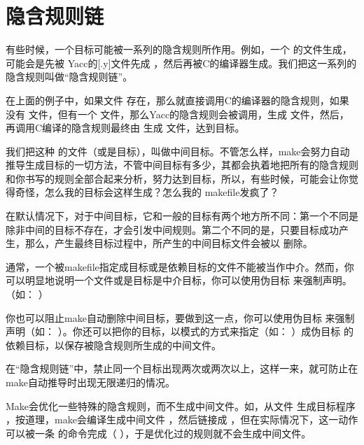 \documentclass[a4paper,10pt]{sphinxmanual}
\begin{document}
\section{隐含规则链}
\label{\detokenize{implicit_rules:id7}}
有些时候，一个目标可能被一系列的隐含规则所作用。例如，一个  的文件生成，可能会是先被
Yacc的{[}.y{]}文件先成  ，然后再被C的编译器生成。我们把这一系列的隐含规则叫做“隐含规则链”。

在上面的例子中，如果文件  存在，那么就直接调用C的编译器的隐含规则，如果没有  文件，但有一个  文件，那么Yacc的隐含规则会被调用，生成  文件，然后，再调用C编译的隐含规则最终由  生成  文件，达到目标。

我们把这种  的文件（或是目标），叫做中间目标。不管怎么样，make会努力自动推导生成目标的一切方法，不管中间目标有多少，其都会执着地把所有的隐含规则和你书写的规则全部合起来分析，努力达到目标，所以，有些时候，可能会让你觉得奇怪，怎么我的目标会这样生成？怎么我的 makefile发疯了？

在默认情况下，对于中间目标，它和一般的目标有两个地方所不同：第一个不同是除非中间的目标不存在，才会引发中间规则。第二个不同的是，只要目标成功产生，那么，产生最终目标过程中，所产生的中间目标文件会被以  删除。

通常，一个被makefile指定成目标或是依赖目标的文件不能被当作中介。然而，你可以明显地说明一个文件或是目标是中介目标，你可以使用伪目标  来强制声明。（如：  ）

你也可以阻止make自动删除中间目标，要做到这一点，你可以使用伪目标  来强制声明（如：  ）。你还可以把你的目标，以模式的方式来指定（如：  ）成伪目标  的依赖目标，以保存被隐含规则所生成的中间文件。

在“隐含规则链”中，禁止同一个目标出现两次或两次以上，这样一来，就可防止在make自动推导时出现无限递归的情况。

Make会优化一些特殊的隐含规则，而不生成中间文件。如，从文件  生成目标程序  ，按道理，make会编译生成中间文件  ，然后链接成  ，但在实际情况下，这一动作可以被一条  的命令完成（  ），于是优化过的规则就不会生成中间文件。
\end{document}
